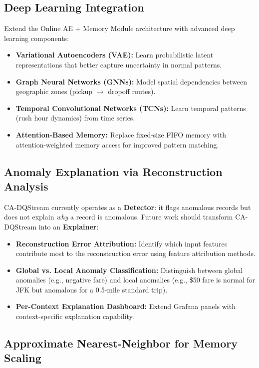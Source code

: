 \subsection{Deep Learning Integration}

Extend the Online AE + Memory Module architecture with advanced deep learning components:
\begin{itemize}
    \item \textbf{Variational Autoencoders (VAE):} Learn probabilistic latent representations that better capture uncertainty in normal patterns.
    \item \textbf{Graph Neural Networks (GNNs):} Model spatial dependencies between geographic zones (pickup $\to$ dropoff routes).
    \item \textbf{Temporal Convolutional Networks (TCNs):} Learn temporal patterns (rush hour dynamics) from time series.
    \item \textbf{Attention-Based Memory:} Replace fixed-size FIFO memory with attention-weighted memory access for improved pattern matching.
\end{itemize}

\subsection{Anomaly Explanation via Reconstruction Analysis}

CA-DQStream currently operates as a \textbf{Detector}: it flags anomalous records but does not explain \emph{why} a record is anomalous. Future work should transform CA-DQStream into an \textbf{Explainer}:

\begin{itemize}
    \item \textbf{Reconstruction Error Attribution:} Identify which input features contribute most to the reconstruction error using feature attribution methods.
    \item \textbf{Global vs. Local Anomaly Classification:} Distinguish between global anomalies (e.g., negative fare) and local anomalies (e.g., \$50 fare is normal for JFK but anomalous for a 0.5-mile standard trip).
    \item \textbf{Per-Context Explanation Dashboard:} Extend Grafana panels with context-specific explanation capability.
\end{itemize}

\subsection{Approximate Nearest-Neighbor for Memory Scaling}

